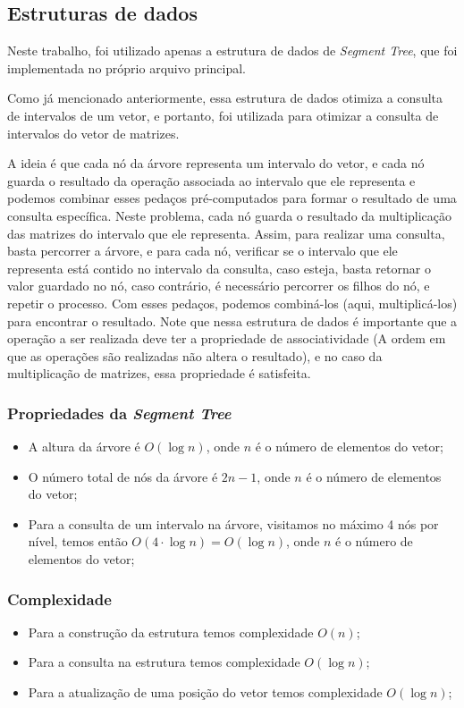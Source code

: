 \documentclass{article}
\begin{document}
\subsection{Estruturas de dados}

Neste trabalho, foi utilizado apenas a estrutura de dados de \emph{Segment Tree}, que foi implementada no próprio arquivo principal.

Como já mencionado anteriormente, essa estrutura de dados otimiza a consulta de intervalos de um vetor, e portanto, foi utilizada para otimizar a consulta de intervalos do vetor de matrizes.

A ideia é que cada nó da árvore representa um intervalo do vetor, e cada nó guarda o resultado da operação associada ao intervalo que ele representa e podemos combinar esses pedaços pré-computados para formar o resultado de uma consulta específica. Neste problema, cada nó guarda o resultado da multiplicação das matrizes do intervalo que ele representa. Assim, para realizar uma consulta, basta percorrer a árvore, e para cada nó, 
verificar se o intervalo que ele representa está contido no intervalo da consulta, caso esteja, basta retornar o valor guardado no nó, caso contrário, é necessário percorrer os filhos do nó, e repetir o processo.
Com esses pedaços, podemos combiná-los (aqui, multiplicá-los) para encontrar o resultado. Note que nessa estrutura de dados é importante que a operação a ser realizada deve ter a propriedade de associatividade (A ordem em que as operações são realizadas não altera o resultado), e no caso da multiplicação de matrizes, essa propriedade é satisfeita.


\subsubsection*{Propriedades da \emph{Segment Tree}}
\begin{itemize}
    \item A altura da árvore é $O(\log n)$, onde $n$ é o número de elementos do vetor;
    \item O número total de nós da árvore é $2n -1$, onde $n$ é o número de elementos do vetor;
    \item Para a consulta de um intervalo na árvore, visitamos no máximo 4 nós por nível, temos então $O(4 \cdot \log n) = O(\log n)$, onde $n$ é o número de elementos do vetor;
\end{itemize}



\subsubsection*{Complexidade}
\begin{itemize}
    \item Para a construção da estrutura temos complexidade $O(n)$;
    \item Para a consulta na estrutura temos complexidade $O(\log n)$;
    \item Para a atualização de uma posição do vetor temos complexidade $O(\log n)$;
\end{itemize}
\end{document}
